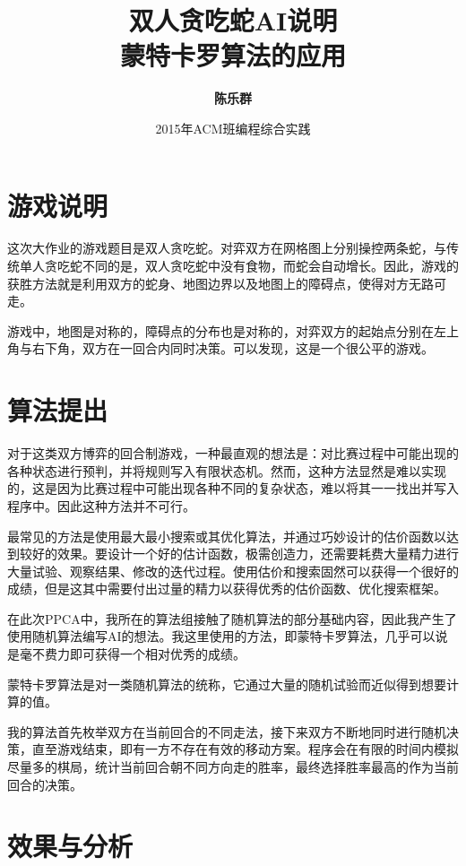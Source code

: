 \documentclass[UTF8]{ctexart}
\title{\bf\Huge{双人贪吃蛇AI说明}\\ \Large{蒙特卡罗算法的应用}}
\author{\bf{陈乐群}}
\date{2015年ACM班编程综合实践}
\begin{document}
\maketitle
\newpage
\tableofcontents
\newpage

\section{游戏说明}

    这次大作业的游戏题目是双人贪吃蛇。对弈双方在网格图上分别操控两条蛇，与传统单人贪吃蛇不同的是，双人贪吃蛇中没有食物，而蛇会自动增长。因此，游戏的获胜方法就是利用双方的蛇身、地图边界以及地图上的障碍点，使得对方无路可走。
    
    游戏中，地图是对称的，障碍点的分布也是对称的，对弈双方的起始点分别在左上角与右下角，双方在一回合内同时决策。可以发现，这是一个很公平的游戏。

\section{算法提出}

    对于这类双方博弈的回合制游戏，一种最直观的想法是：对比赛过程中可能出现的各种状态进行预判，并将规则写入有限状态机。然而，这种方法显然是难以实现的，这是因为比赛过程中可能出现各种不同的复杂状态，难以将其一一找出并写入程序中。因此这种方法并不可行。
    
    最常见的方法是使用最大最小搜索或其优化算法，并通过巧妙设计的估价函数以达到较好的效果。要设计一个好的估计函数，极需创造力，还需要耗费大量精力进行大量试验、观察结果、修改的迭代过程。使用估价和搜索固然可以获得一个很好的成绩，但是这其中需要付出过量的精力以获得优秀的估价函数、优化搜索框架。
    
    在此次PPCA中，我所在的算法组接触了随机算法的部分基础内容，因此我产生了使用随机算法编写AI的想法。我这里使用的方法，即蒙特卡罗算法，几乎可以说是毫不费力即可获得一个相对优秀的成绩。

    蒙特卡罗算法是对一类随机算法的统称，它通过大量的随机试验而近似得到想要计算的值。
    
    我的算法首先枚举双方在当前回合的不同走法，接下来双方不断地同时进行随机决策，直至游戏结束，即有一方不存在有效的移动方案。程序会在有限的时间内模拟尽量多的棋局，统计当前回合朝不同方向走的胜率，最终选择胜率最高的作为当前回合的决策。

\section{效果与分析}
    
\end{document}
